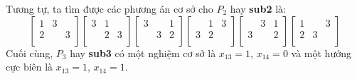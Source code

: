 Tương tự, ta tìm được các phương án cơ sở cho $P_2$ hay {\bf sub2} là:
\begin{displaymath}
\left[ \begin{array}{ccc}
1 & 3 &  \\
2 &  & 3 \\
\end{array} \right]
\left[ \begin{array}{ccc}
3 & 1 &  \\
 & 2 & 3\\
\end{array} \right]
\left[ \begin{array}{ccc}
3 & & 1 \\
 & 3 & 2\\
\end{array} \right]
\left[ \begin{array}{ccc}
 & 1 & 3 \\
3 & 2 &  \\
\end{array} \right]
\left[ \begin{array}{ccc}
 & 3 & 1 \\
3 &  & 2 \\
\end{array} \right]
\left[ \begin{array}{ccc}
 1&  & 3 \\
2 &3  &  \\
\end{array} \right]
\end{displaymath}
Cuối cùng, $P_3$ hay {\bf sub3} có một nghiệm cơ sở là $x_{13}=1$, $x_{14}=0$ và một hướng cực biên là $x_{13}=1$, $x_{14}=1$.

